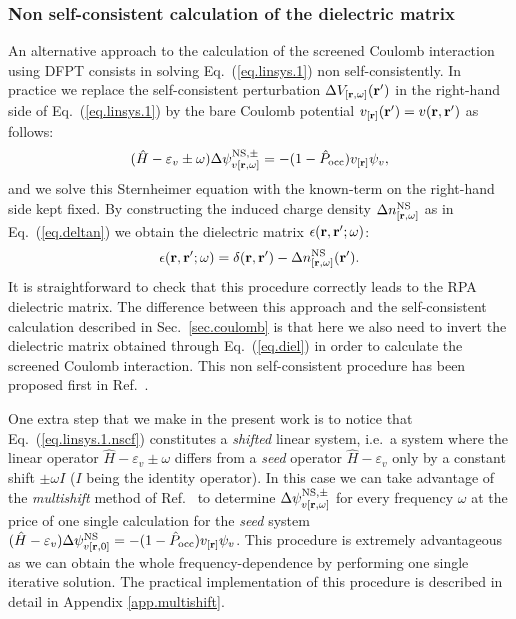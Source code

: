 \documentclass[twocolumn,prb,showpacs,superscriptaddress]{revtex4}
\def\w{\omega}
\def\H{\hat{H}}
\def\P{\hat{P}_{\rm occ}}
\def\E{\varepsilon}
\def\r{{\bf r}}
\def\rp{{\bf r^\prime}}
\begin{document}
\subsubsection{Non self-consistent calculation of the dielectric matrix}\label{sec.diel.nscf}

An alternative approach to the calculation of the screened Coulomb interaction
using DFPT consists in solving Eq.\ (\ref{eq.linsys.1}) non self-consistently.
In practice we replace the self-consistent perturbation $\Delta V_{[\r,\w]}(\rp)$
in the right-hand side of Eq.\ (\ref{eq.linsys.1}) by the bare Coulomb potential
$v_{[\r]}(\rp)=v(\r,\rp)$ as follows:
  \begin{equation}\label{eq.linsys.1.nscf}
  (\H-\E_v\pm\w) \Delta \psi^{{\rm NS},\pm}_{v[\r,\w]}  = -(1-\P)  v_{[\r]} \psi_v, 
  \end{equation}
and we solve this Sternheimer equation with the known-term on the right-hand side
kept fixed. By constructing the induced charge density $\Delta n^{\rm NS}_{[\r,\w]}$ as in Eq.\ (\ref{eq.deltan})
we obtain the dielectric matrix $\epsilon(\r,\rp;\w)$:
  \begin{equation}\label{eq.diel}
  \epsilon(\r,\rp;\w) = \delta(\r,\rp) - \Delta n^{\rm NS}_{[\r,\w]}(\rp).
  \end{equation}
It is straightforward to check that this procedure correctly leads to the RPA
dielectric matrix.\cite{hl86-prb}
The difference between this approach and the self-consistent calculation described in
Sec.\ \ref{sec.coulomb} is that here we also need to invert the dielectric matrix obtained
through Eq.\ (\ref{eq.diel}) in order to calculate the screened Coulomb interaction.
This non self-consistent procedure has been proposed first in Ref.\ .

One extra step that we make in the present work is to notice that Eq.\ (\ref{eq.linsys.1.nscf})
constitutes a {\it shifted} linear system, i.e.\ a system where the linear operator
$\H-\E_v\pm\w$ differs from a {\it seed} operator $\H-\E_v$ only by a constant shift $\pm\w I$ 
($I$ being the identity operator). 
In this case we can take
advantage of the {\it multishift} method of Ref.\ 
to determine $\Delta \psi^{{\rm NS},\pm}_{v[\r,\w]}$ for every frequency $\w$
at the price of one single calculation for the {\it seed} system $(\H-\E_v) \Delta \psi^{{\rm NS}}_{v[\r,0]}  = -(1-\P)  v_{[\r]} \psi_v$.
This procedure is extremely advantageous as we can obtain the whole frequency-dependence 
by performing one single iterative solution. 
The practical implementation of this procedure is described in detail in Appendix \ref{app.multishift}.
\end{document}
